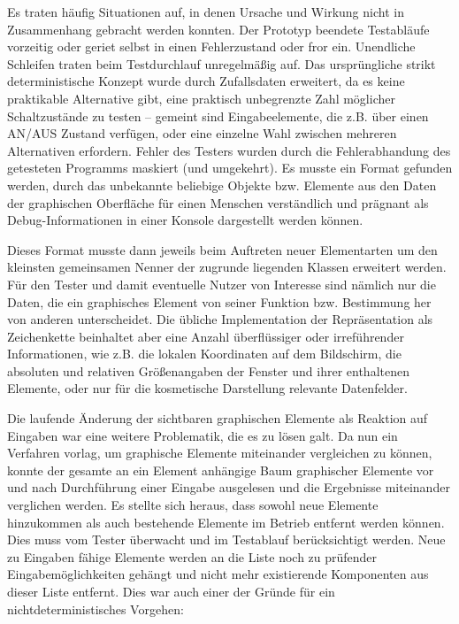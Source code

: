 Es traten häufig Situationen auf, in denen Ursache und Wirkung nicht
in Zusammenhang gebracht werden konnten. Der Prototyp beendete
Testabläufe vorzeitig oder geriet selbst in einen Fehlerzustand
oder fror ein. Unendliche Schleifen traten beim Testdurchlauf unregelmäßig auf.
Das ursprüngliche strikt deterministische Konzept wurde durch Zufallsdaten
erweitert, da es keine praktikable Alternative gibt, eine praktisch
unbegrenzte Zahl möglicher Schaltzustände zu testen -- gemeint
sind Eingabeelemente, die z.B. über einen AN/AUS Zustand verfügen,
oder eine einzelne Wahl zwischen mehreren Alternativen erfordern.
Fehler des Testers wurden durch die Fehlerabhandung des getesteten
Programms maskiert (und umgekehrt). Es musste ein Format gefunden
werden, durch das unbekannte beliebige Objekte bzw. Elemente aus den Daten
der graphischen Oberfläche für einen Menschen verständlich und prägnant
als Debug-Informationen in einer Konsole dargestellt werden können.

Dieses Format musste dann jeweils beim Auftreten neuer Elementarten
um den kleinsten gemeinsamen Nenner der zugrunde liegenden Klassen
erweitert werden. Für den Tester und damit eventuelle Nutzer von
Interesse sind nämlich nur die Daten, die ein graphisches Element
von seiner Funktion bzw. Bestimmung her von anderen unterscheidet.
Die übliche Implementation der Repräsentation als Zeichenkette
beinhaltet aber eine Anzahl überflüssiger oder irreführender
Informationen, wie z.B. die lokalen Koordinaten auf dem Bildschirm,
die absoluten und relativen Größenangaben der Fenster und ihrer
enthaltenen Elemente, oder nur für die kosmetische Darstellung
relevante Datenfelder.

Die laufende Änderung der sichtbaren graphischen Elemente als Reaktion
auf Eingaben war eine weitere Problematik, die es zu lösen galt.
Da nun ein Verfahren vorlag, um graphische Elemente miteinander
vergleichen zu können, konnte der gesamte an ein Element anhängige Baum
graphischer Elemente vor und nach Durchführung einer Eingabe ausgelesen
und die Ergebnisse miteinander verglichen werden. Es stellte sich heraus,
dass sowohl neue Elemente hinzukommen als auch bestehende Elemente im
Betrieb entfernt werden können. Dies muss vom Tester überwacht und
im Testablauf berücksichtigt werden. Neue zu Eingaben fähige Elemente werden 
an die Liste noch zu prüfender Eingabemöglichkeiten gehängt und
nicht mehr existierende Komponenten aus dieser Liste entfernt. Dies war
auch einer der Gründe für ein nichtdeterministisches Vorgehen:

